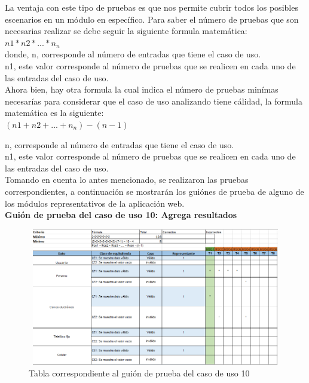 	\noindent La ventaja con este tipo de pruebas es que nos permite cubrir todos los posibles escenarios en un módulo en específico. Para saber el número de pruebas que son necesarias realizar se debe seguir la siguiente formula matemática:\\
	$ n1 * n2 * ... * n_{n} $ \\
	donde, 
	n, corresponde al número de entradas que tiene el caso de uso.\\
	n1, este valor corresponde al número de pruebas que se realicen en cada uno de las entradas del caso de uso.\\
	
	\noindent Ahora bien, hay otra formula la cual indica el número de pruebas minímas necesarías para considerar que el caso de uso analizando tiene cálidad, la formula matemática es la siguiente: \\
	
	$ (n1 + n2 + ... + n_{n}) - (n - 1) $
	
	n, corresponde al número de entradas que tiene el caso de uso.\\
	n1, este valor corresponde al número de pruebas que se realicen en cada uno de las entradas del caso de uso.\\
	
	\noindent Tomando en cuenta lo antes mencionado, se realizaron las pruebas correspondientes, a continuación se mostrarán los guiónes de prueba de alguno de los módulos representativos de la aplicación web.\\
	
	\textbf{Guión de prueba del caso de uso 10: Agrega resultados}
	
	\begin{figure}[hbt!]
		\centering
		\includegraphics[width=14cm, height=6cm]{Imagenes/Pruebas/GuionPruebaCU10}
		\caption{Tabla correspondiente al guión de prueba del caso de uso 10}
		\label{guionpruebaCU10}
	\end{figure}

